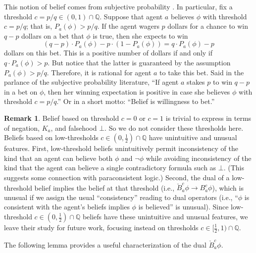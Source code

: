 \documentclass[12pt]{article}
\theoremstyle{definition}
\newtheorem{remark}[theorem]{Remark}
\newcommand{\Rat}{\mathbb{Q}}  %
\begin{document}
This notion of belief comes from subjective probability
\cite{Jeffrey2004:sptrt}.  In particular, fix a threshold
$c=p/q\in(0,1)\cap\Rat$.  Suppose that agent $a$ believes $\phi$ with
threshold $c=p/q$; that is, $P_a(\phi)>p/q$.  If the agent wagers $p$
dollars for a chance to win $q-p$ dollars on a bet that $\phi$ is
true, then she expects to win
\[
(q-p)\cdot P_a(\phi) - p\cdot(1-P_a(\phi)) = q\cdot P_a(\phi) - p
\]
dollars on this bet.  This is a positive number of dollars if and only
if $q\cdot P_a(\phi)>p$.  But notice that the latter is guaranteed by
the assumption $P_a(\phi)>p/q$.  Therefore, it is rational for agent
$a$ to take this bet.  Said in the parlance of the subjective
probability literature, ``If agent $a$ stakes $p$ to win $q-p$ in a
bet on $\phi$, then her winning expectation is positive in case she
believes $\phi$ with threshold $c= p/q$.''  Or in a short motto:
``Belief is willingness to bet.''

\begin{remark}
  Belief based on threshold $c=0$ or $c=1$ is trivial to express in
  terms of negation, $K_a$, and falsehood $\bot$.  So we do not
  consider these thresholds here.  Beliefs based on low-thresholds
  $c\in(0,\frac 12)\cap\Rat$ have unintuitive and unusual features.
  First, low-threshold beliefs unintuitively permit inconsistency of
  the kind that an agent can believe both $\phi$ and $\lnot\phi$ while
  avoiding inconsistency of the kind that the agent can believe a
  single contradictory formula such as $\bot$. (This suggests some
  connection with paraconsistent logic.)  Second, the dual of a
  low-threshold belief implies the belief at that threshold (i.e.,
  $\check B_a^c\phi\to B_a^c\phi$), which is unusual if we assign the
  usual ``consistency'' reading to dual operators (i.e., ``$\phi$ is
  consistent with the agent's beliefs implies $\phi$ is believed'' is
  unusual).  Since low-threshold $c\in(0,\frac12)\cap\Rat$ beliefs
  have these unintuitive and unusual features, we leave their study
  for future work, focusing instead on thresholds $c\in[\frac
  12,1)\cap\Rat$.
\end{remark}

The following lemma provides a useful characterization of the dual
$\check B^c_a\phi$.
\end{document}

